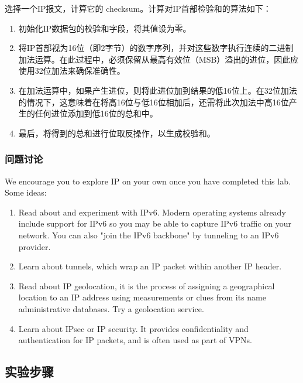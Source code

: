 \documentclass{article}
\begin{document}
	选择一个IP报文，计算它的 checksum。计算对IP首部检验和的算法如下：
	
	\begin{enumerate}[label=(\arabic*)] %
		\item 初始化IP数据包的校验和字段，将其值设为零。
		\item 将IP首部视为16位（即2字节）的数字序列，并对这些数字执行连续的二进制加法运算。在此过程中，必须保留从最高有效位（MSB）溢出的进位，因此应使用32位加法来确保准确性。
		\item 在加法运算中，如果产生进位，则将此进位加到结果的低16位上。在32位加法的情况下，这意味着在将高16位与低16位相加后，还需将此次加法中高16位产生的任何进位添加到低16位的总和中。
		\item 最后，将得到的总和进行位取反操作，以生成校验和。
	\end{enumerate}
	
	\subsubsection{问题讨论}
	
	We encourage you to explore IP on your own once you have completed this lab. Some ideas:
	
	\begin{enumerate}
		\item Read about and experiment with IPv6. Modern operating systems already include support for IPv6 so you may be able to capture IPv6 traffic on your network. You can also "join the IPv6 backbone" by tunneling to an IPv6 provider.
		\item Learn about tunnels, which wrap an IP packet within another IP header.
		\item Read about IP geolocation, it is the process of assigning a geographical location to an IP address using measurements or clues from its name administrative databases. Try a geolocation service.
		\item Learn about IPsec or IP security. It provides confidentiality and authentication for IP packets, and is often used as part of VPNs.
	\end{enumerate}
	
	\subsection{实验步骤}
	
\end{document}
